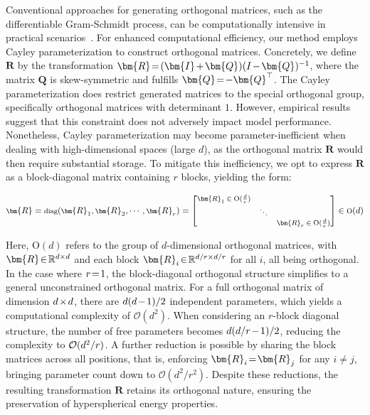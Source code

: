 Conventional approaches for generating orthogonal matrices, such as the differentiable Gram-Schmidt process, can be computationally intensive in practical scenarios~\cite{liu2021orthogonal}. For enhanced computational efficiency, our method employs Cayley parameterization to construct orthogonal matrices. Concretely, we define $\bm{R}$ by the transformation $\thickmuskip=2mu \medmuskip=2mu \bm{R}=(\bm{I}+\bm{Q})(I-\bm{Q})^{-1}$, where the matrix $\bm{Q}$ is skew-symmetric and fulfills $\thickmuskip=2mu \medmuskip=2mu \bm{Q}=-\bm{Q}^\top$. The Cayley parameterization does restrict generated matrices to the special orthogonal group, specifically orthogonal matrices with determinant $1$. However, empirical results suggest that this constraint does not adversely impact model performance. Nonetheless, Cayley parameterization may become parameter-inefficient when dealing with high-dimensional spaces (large $d$), as the orthogonal matrix $\bm{R}$ would then require substantial storage. To mitigate this inefficiency, we opt to express $\bm{R}$ as a block-diagonal matrix containing $r$ blocks, yielding the form:

\begin{equation}
    \footnotesize
    \bm{R}=\text{diag}(\bm{R}_1,\bm{R}_2,\cdots,\bm{R}_r)=\begin{bmatrix}
    \bm{R}_1\in \text{O}(\frac{d}{r}) &  &\\
    &\ddots & \\
    & & \bm{R}_r\in \text{O}(\frac{d}{r})
    \end{bmatrix}\in \text{O}(d)
\end{equation}

Here, $\text{O}(d)$ refers to the group of $d$-dimensional orthogonal matrices, with $\thickmuskip=2mu \medmuskip=2mu \bm{R}\in\mathbb{R}^{d\times d}$ and each block $\thickmuskip=2mu \medmuskip=2mu \bm{R}_i\in\mathbb{R}^{d/r\times d/r}$ for all $i$, all being orthogonal. In the case where $\thickmuskip=2mu \medmuskip=2mu r=1$, the block-diagonal orthogonal structure simplifies to a general unconstrained orthogonal matrix. For a full orthogonal matrix of dimension $\thickmuskip=2mu \medmuskip=2mu d\times d$, there are $\thickmuskip=2mu \medmuskip=2mu d(d-1)/2$ independent parameters, which yields a computational complexity of $\mathcal{O}(d^2)$. When considering an $r$-block diagonal structure, the number of free parameters becomes $\thickmuskip=2mu \medmuskip=2mu d(d/r-1)/2$, reducing the complexity to $\thickmuskip=2mu \medmuskip=2mu \mathcal{O}(d^2/r)$. A further reduction is possible by sharing the block matrices across all positions, that is, enforcing $\thickmuskip=2mu \medmuskip=2mu\bm{R}_i=\bm{R}_j$ for any $i\neq j$, bringing parameter count down to $\mathcal{O}(d^2/r^2)$. Despite these reductions, the resulting transformation $\bm{R}$ retains its orthogonal nature, ensuring the preservation of hyperspherical energy properties.

